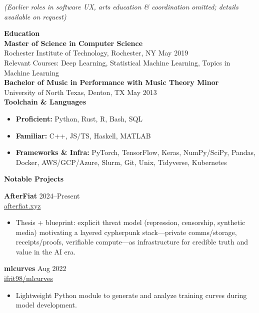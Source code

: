 \documentclass[10.5pt]{res}
\begin{document}
\begin{resume}
{\it \centering \hspace{1.15 cm}(Earlier roles in software UX, arts education \& coordination omitted; details available on request)}

{\bf Education} \\
\textbf{Master of Science in Computer Science}\\
Rochester Institute of Technology, Rochester, NY \hfill May 2019\\
Relevant Courses: Deep Learning, Statistical Machine Learning, Topics in Machine Learning\\[0.2cm]
\textbf{Bachelor of Music in Performance with Music Theory Minor} \\
University of North Texas, Denton, TX \hfill May 2013\\

{\bf Toolchain \& Languages}
\begin{itemize}
    \item \textbf{Proficient:} Python, Rust, R, Bash, SQL
    \item \textbf{Familiar:} C++, JS/TS, Haskell, MATLAB
    \item \textbf{Frameworks \& Infra:} PyTorch, TensorFlow, Keras, NumPy/SciPy, Pandas, Docker, AWS/GCP/Azure, Slurm, Git, Unix, Tidyverse, Kubernetes
\end{itemize}

{\bf Notable Projects} \\

{\bf AfterFiat} \hfill 2024--Present\\
\href{https://afterfiat.xyz}{afterfiat.xyz} \\
\begin{itemize}\rightmargin=0cm \itemsep 2pt
    \item Thesis + blueprint: explicit threat model (repression, censorship, synthetic media) motivating a layered cypherpunk stack---private comms/storage, receipts/proofs, verifiable compute---as infrastructure for credible truth and value in the AI era.
\end{itemize}

{\bf mlcurves} \hfill Aug 2022\\
\href{https://github.com/ifrit98/mlcurves}{ifrit98/mlcurves} \\
\begin{itemize}\rightmargin=0cm \itemsep 2pt
    \item Lightweight Python module to generate and analyze training curves during model development.
\end{itemize}


\end{resume}
\end{document}
